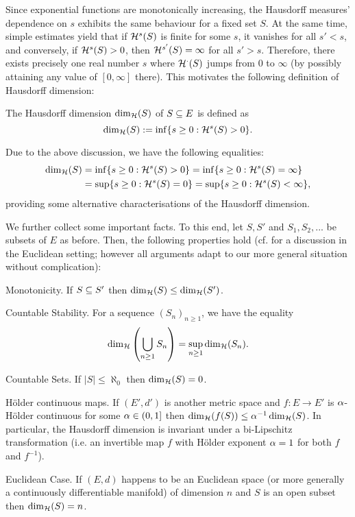 Since exponential functions are monotonically increasing, the Hausdorff measures' dependence on $s$ exhibits the same behaviour for a fixed set $S$. At the same time, simple estimates yield that if $\mathcal{H}^s(S)$ is finite for some $s$, it vanishes for all $s'<s$, and conversely, if $\mathcal{H}^s(S)>0$, then $\mathcal{H}^{s'}(S)=\infty$ for all $s'>s$. Therefore, there exists precisely one real number $s$ where $\mathcal{H}^\cdot(S)$ jumps from $0$ to $\infty$ (by possibly attaining any value of $[0,\infty]$ there). This motivates the following definition of Hausdorff dimension:
\begin{defin}
  The Hausdorff dimension $\dim_{\mathcal{H}}(S)$ of $S\subseteq E$ is defined as
  \[
    \dim_{\mathcal{H}}(S):=\inf\{s\geq0:\mathcal{H}^s(S)>0\}.
  \]
\end{defin}
Due to the above discussion, we have the following equalities:
\begin{align*}
   \dim_{\mathcal{H}}(S)&=\inf\{s\geq0:\mathcal{H}^s(S)>0\}=\inf\{s\geq0:\mathcal{H}^s(S)=\infty\}\\
           &=\sup\{s\geq0:\mathcal{H}^s(S)=0\}=\sup\{s\geq0:\mathcal{H}^s(S)<\infty\},
\end{align*}
providing some alternative characterisations of the Hausdorff dimension.

We further collect some important facts. To this end, let $S,S'$ and $S_1,S_2,...$ be subsets of $E$ as before. Then, the following properties hold (cf. \cite[p.32f]{falconer2007fractal} for a discussion in the Euclidean setting; however all arguments adapt to our more general situation without complication):
\begin{compactdesc}
  \item[Monotonicity.] If $S\subseteq S'$ then $\dim_{\mathcal{H}}(S)\leq\dim_{\mathcal{H}}(S')$. 
  \item[Countable Stability.] For a sequence $(S_n)_{n\geq1}$, we have the equality
  \[ 
    \dim_{\mathcal{H}}\left(\bigcup_{n\geq1}S_n\right)=\sup_{n\geq1} \dim_{\mathcal{H}}(S_n).
  \]
  \item[Countable Sets.] If $|S|\leq\aleph_0$ then $\dim_{\mathcal{H}}(S)=0$.
  \item[H\"older continuous maps.] If $(E',d')$ is another metric space and $f:E\to E'$ is $\alpha$-H\"older continuous for some $\alpha\in(0,1]$ then $\dim_{\mathcal{H}}(f(S))\leq \alpha^{-1}\dim_{\mathcal{H}}(S)$. In particular, the Hausdorff dimension is invariant under a bi-Lipschitz transformation (i.e. an invertible map $f$ with H\"older exponent $\alpha=1$ for both $f$ and $f^{-1}$).
  \item[Euclidean Case.] If $(E,d)$ happens to be an Euclidean space (or more generally a continuously differentiable manifold) of dimension $n$ and $S$ is an open subset then $\dim_{\mathcal{H}}(S)=n$.
\end{compactdesc}

